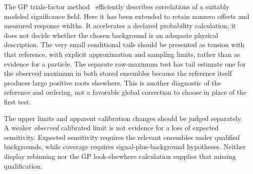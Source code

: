 The GP trials-factor method~\cite{ananiev} efficiently describes correlations of a suitably modeled significance field. Here it has been extended to retain nonzero offsets and measured response widths. It accelerates a declared probability calculation; it does not decide whether the chosen background is an adequate physical description. The very small conditional tails should be presented as tension with that reference, with explicit approximation and sampling limits, rather than as evidence for a particle. The separate raw-maximum test has tail estimate one for the observed maximum in both stored ensembles because the reference itself produces large positive roots elsewhere. This is another diagnostic of the reference and ordering, not a favorable global correction to choose in place of the first test.

The upper limits and apparent calibration changes should be judged separately. A weaker \emph{observed} calibrated limit is not evidence for a loss of expected sensitivity. Expected sensitivity requires the relevant ensembles under qualified backgrounds, while coverage requires signal-plus-background hypotheses. Neither display rebinning nor the GP look-elsewhere calculation supplies that missing qualification.
